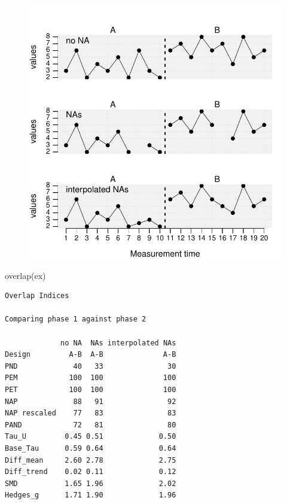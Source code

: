\documentclass[
  letterpaper,
  DIV=11,
  numbers=noendperiod]{scrreprt}
\newenvironment{Shaded}{\begin{snugshade}}{\end{snugshade}}
\newcommand{\FunctionTok}[1]{\textcolor[rgb]{0.28,0.35,0.67}{#1}}
\newcommand{\NormalTok}[1]{\textcolor[rgb]{0.00,0.23,0.31}{#1}}
\begin{document}
\begin{figure}[H]

{\centering \includegraphics{./ch_describe_manipulate_files/figure-pdf/fillmissing_example-1.pdf}

}

\end{figure}

\begin{Shaded}
\begin{Highlighting}[]
\FunctionTok{overlap}\NormalTok{(ex)}
\end{Highlighting}
\end{Shaded}

\begin{verbatim}
Overlap Indices

Comparing phase 1 against phase 2 

             no NA  NAs interpolated NAs
Design         A-B  A-B              A-B
PND             40   33               30
PEM            100  100              100
PET            100  100              100
NAP             88   91               92
NAP rescaled    77   83               83
PAND            72   81               80
Tau_U         0.45 0.51             0.50
Base_Tau      0.59 0.64             0.64
Diff_mean     2.60 2.78             2.75
Diff_trend    0.02 0.11             0.12
SMD           1.65 1.96             2.02
Hedges_g      1.71 1.90             1.96
\end{verbatim}
\end{document}
